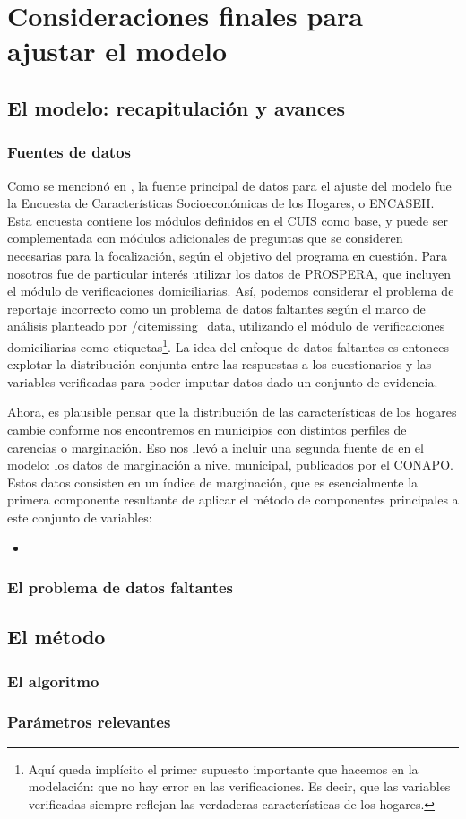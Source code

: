 \chapter{Consideraciones finales para ajustar el modelo}
\label{chap:ajuste}
\section*{El modelo: recapitulación y avances}
\subsection*{Fuentes de datos}
Como se mencionó en \cite{mzl_entregable_2}, la fuente principal de datos para el ajuste del modelo fue la Encuesta de Características Socioeconómicas de los Hogares, o ENCASEH. Esta encuesta contiene los módulos definidos en el CUIS como base, y puede ser complementada con módulos adicionales de preguntas que se consideren necesarias para la focalización, según el objetivo del programa en cuestión. Para nosotros fue de particular interés utilizar los datos de PROSPERA, que incluyen el módulo de verificaciones domiciliarias. Así, podemos considerar el problema de reportaje incorrecto como un problema de datos faltantes según el marco de análisis planteado por /cite{missing_data}, utilizando el módulo de verificaciones domiciliarias como etiquetas\footnote{Aquí queda implícito el primer supuesto importante que hacemos en la modelación: que no hay error en las verificaciones. Es decir, que las variables verificadas siempre reflejan las verdaderas características de los hogares.}. La idea del enfoque de datos faltantes es entonces explotar la distribución conjunta entre las respuestas a los cuestionarios y las variables verificadas para poder imputar datos dado un conjunto de evidencia.
\par
\noindent
Ahora, es plausible pensar que la distribución de las características de los hogares cambie conforme nos encontremos en municipios con distintos perfiles de carencias o marginación. Eso nos llevó a incluir una segunda fuente de en el modelo: los datos de marginación a nivel municipal, publicados por el CONAPO. Estos datos consisten en un índice de marginación, que es esencialmente la primera componente resultante de aplicar el método de componentes principales a este conjunto de variables:
\begin{itemize}
    \item
\end{itemize}
\subsection*{El problema de datos faltantes}
\section*{El método}
\subsection*{El algoritmo}
\subsection*{Parámetros relevantes}
